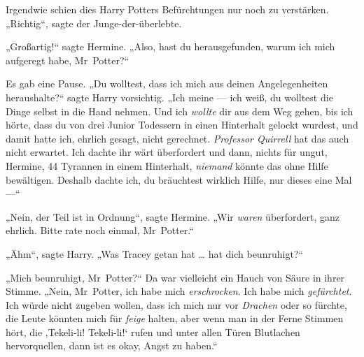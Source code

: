 Irgendwie schien dies Harry Potters Befürchtungen nur noch zu verstärken.
„Richtig“, sagte der Junge-der-überlebte.

„Großartig!“ sagte Hermine.
„Also, hast du herausgefunden, warum ich mich aufgeregt habe, Mr~Potter?“

Es gab eine Pause.
„Du wolltest, dass ich mich aus deinen Angelegenheiten heraushalte?“ sagte Harry vorsichtig.
„Ich meine — ich weiß, du wolltest die Dinge selbst in die Hand nehmen. Und ich \emph{wollte} dir aus dem Weg gehen, bis ich hörte, dass du von drei Junior Todessern in einen Hinterhalt gelockt wurdest, und damit hatte ich, ehrlich gesagt, nicht gerechnet. \emph{Professor Quirrell} hat das auch nicht erwartet. Ich dachte ihr wärt überfordert und dann, nichts für ungut, Hermine, 44 Tyrannen in einem Hinterhalt, \emph{niemand} könnte das ohne Hilfe bewältigen. Deshalb dachte ich, du bräuchtest wirklich Hilfe, nur dieses eine Mal —“

„Nein, der Teil ist in Ordnung“, sagte Hermine.
„Wir \emph{waren} überfordert, ganz ehrlich. Bitte rate noch einmal, Mr~Potter.“

„Ähm“, sagte Harry.
„Was Tracey getan hat … hat dich beunruhigt?“

„Mich beunruhigt, Mr~Potter?“ Da war vielleicht ein Hauch von Säure in ihrer Stimme.
„Nein, Mr~Potter, ich habe mich \emph{erschrocken}. Ich habe mich \emph{gefürchtet}. Ich würde nicht zugeben wollen, dass ich mich nur vor \emph{Drachen} oder so fürchte, die Leute könnten mich für \emph{feige} halten, aber wenn man in der Ferne Stimmen hört, die ‚Tekeli-li! Tekeli-li!‘ rufen und unter allen Türen Blutlachen hervorquellen, dann ist es okay, Angst zu haben.“

